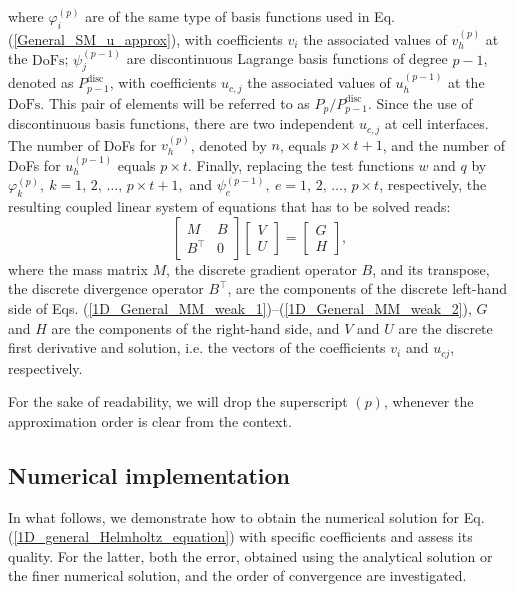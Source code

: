 \documentclass[review,3p]{elsarticle}
\begin{document}
where $\varphi _{i}^{(p)}$ are of the same type of basis functions used in Eq. (\ref{General_SM_u_approx}), with coefficients $v_i$ the associated values of $v_h^{(p)}$ at the $\text{DoFs}$;
$\psi _{j} ^{(p-1)}$ are discontinuous Lagrange basis functions of degree $p-1$, denoted as $P_{p-1}^{\text{disc}}$, with coefficients $u_{c,j}$ the associated values of $u_h^{(p-1)}$ at the $\text{DoFs}$. 
This pair of elements will be referred to as $P_p/P_{p-1}^{\text{disc}}$.
Since the use of discontinuous basis functions, there are two independent $u_{c,j}$ at cell interfaces.
The number of DoFs for $v_h^{(p)}$, denoted by $n$, equals $p \times t + 1$, and the number of DoFs for $u_h^{(p-1)}$ equals $p \times t$. 
Finally, replacing the test functions $w$ and $q$ by $\varphi _{k}^{(p)} , ~{k} = 1, \,2, \, \ldots , \, p \times t + 1, $ and $ \psi _{e}^{(p-1)} ,~ {e} = 1, \,2, \, \ldots , \, p \times t$, respectively, the resulting coupled linear system of equations that has to be solved reads:
\begin{equation}
 \left[ \begin{array}{cc} M & B  \\ B^\top & 0 \end{array}\right] \left[ \begin{array}{cc} {V} \\ {U} \end{array}\right] =\left[ \begin{array}{cc} G \\ H \end{array}\right], \label{matrix equation mix FEM}
\end{equation}
where the mass matrix $M$, the discrete gradient operator $B$, and its transpose, the discrete divergence operator $B^\top$, are the components of the discrete left-hand side of Eqs. (\ref{1D_General_MM_weak_1})--(\ref{1D_General_MM_weak_2}), $G$ and $H$ are the components of the right-hand side, and $V$ and $U$ are the discrete first derivative and solution, i.e. the vectors of the coefficients $v_i$ and $u_{cj}$, respectively.

For the sake of readability, we will drop the superscript $(p)$, whenever the approximation order is clear from the context.

\subsection{Numerical implementation}

In what follows, we demonstrate how to obtain the numerical solution for Eq. (\ref{1D_general_Helmholtz_equation}) with specific coefficients and assess its quality. For the latter, both the error, obtained using the analytical solution or the finer numerical solution, and the order of convergence are investigated.
\end{document}
